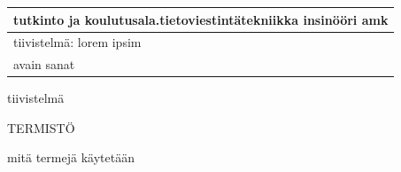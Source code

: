 \documentclass[11pt,a4paper,titlepage,oneside]{article}
\begin{document}
\begin{tabular}{ | l | }
    \begin{minipage}[t][1.5cm][t]{10cm}
    tutkinto ja koulutusala.\newline  tietoviestintätekniikka insinööri amk  

    \end{minipage}\\ \hline

    \begin{minipage}[t][7cm][t]{5cm}
    tiivistelmä: \newline lorem ipsim
    \end{minipage}\\ \hline

    \begin{minipage}[t][2cm][t]{5cm}
    avain sanat
    \end{minipage}\\ \hline

\end{tabular}

\newpage




tiivistelmä








\newpage



\setcounter{page}{0}
\pagestyle{empty}

\tableofcontents





\newpage





TERMISTÖ

mitä termejä käytetään

\newpage





\clearpage
\setcounter{page}{1}
\end{document}
